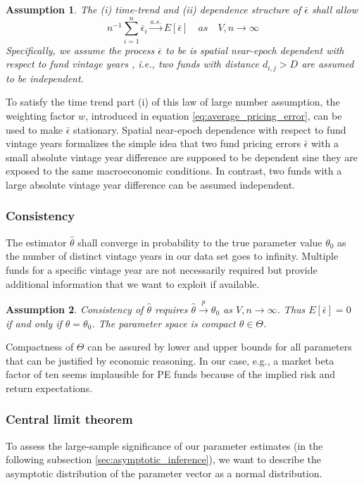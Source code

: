 \documentclass[12pt]{article}
\newtheorem{assume}{Assumption}
\begin{document}
\begin{assume}
	\label{as:lln}
	The (i) time-trend and (ii) dependence structure of $\bar{\epsilon}$ shall allow
	\[
	n^{-1} \sum_{i=1}^n \overline{\epsilon}_i \overset{a.s.}\to E[\bar{\epsilon}]
	\quad {as} \quad V,n \to \infty
	\]
	Specifically, we assume the process $\overline{\epsilon}$ to be is spatial near-epoch dependent with respect to fund vintage years \citep{JP12}, i.e., two funds with distance $d_{i,j}>D$ are assumed to be independent.
\end{assume}
To satisfy the time trend part (i) of this law of large number assumption, the weighting factor $w$, introduced in equation \ref{eq:average_pricing_error}, can be used to make $\bar{\epsilon}$ stationary.
Spatial near-epoch dependence with respect to fund vintage years formalizes the simple idea that two fund pricing errors $\bar{\epsilon}$ with a small absolute vintage year difference are supposed to be dependent sine they are exposed to the same macroeconomic conditions.
In contrast, two funds with a large absolute vintage year difference can be assumed independent.

\subsubsection{Consistency}
The estimator $\hat{\theta}$ shall converge in probability to the true parameter value $\theta_0$ as the number of distinct vintage years in our data set goes to infinity.
Multiple funds for a specific vintage year are not necessarily required but provide additional information that we want to exploit if available.

\begin{assume}
\label{as:consistency}
 Consistency of $\hat{\theta}$ requires $\hat{\theta} \overset{p}{\to} \theta_0$ as $V,n \to \infty$.
 Thus $E[\bar{\epsilon}]=0$ if and only if $\theta=\theta_0$.
 The parameter space is compact $\theta \in \Theta$.
\end{assume}
Compactness of $\Theta$ can be assured by lower and upper bounds for all parameters that can be justified by economic reasoning. In our case, e.g., a market beta factor of ten seems implausible for PE funds because of the implied risk and return expectations.

\subsubsection{Central limit theorem}
To assess the large-sample significance of our parameter estimates (in the following subsection \ref{sec:asymptotic_inference}), we want to describe the asymptotic distribution of the parameter vector as a normal distribution.
\end{document}
